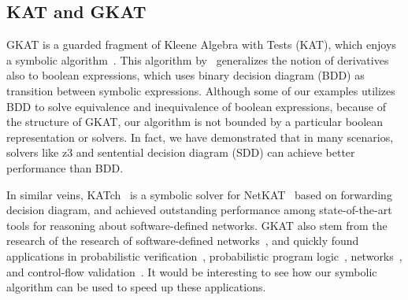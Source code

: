 \documentclass[conference]{IEEEtran}
\begin{document}
\subsection{KAT and GKAT}

GKAT is a guarded fragment of Kleene Algebra with Tests (KAT), which enjoys a symbolic algorithm~\cite{pous_SymbolicAlgorithmsLanguage_2015}.
This algorithm by~\citeauthor{pous_SymbolicAlgorithmsLanguage_2015} generalizes the notion of derivatives also to boolean expressions, which uses binary decision diagram (BDD) as transition between symbolic expressions.
Although some of our examples utilizes BDD to solve equivalence and inequivalence of boolean expressions, because of the structure of GKAT, our algorithm is not bounded by a particular boolean representation or solvers.
In fact, we have demonstrated that in many scenarios, solvers like z3 and sentential decision diagram (SDD) can achieve better performance than BDD.

In similar veins, KATch~\cite{moeller_KATchFastSymbolic_2024} is a symbolic solver for NetKAT~\cite{anderson_NetKATSemanticFoundations_2014} based on forwarding decision diagram, and achieved outstanding performance among state-of-the-art tools for reasoning about software-defined networks.
GKAT also stem from the research of the research of software-defined networks~\cite{smolka_ScalableVerificationProbabilistic_2019,smolka_GuardedKleeneAlgebra_2020}, and quickly found applications in probabilistic verification~\cite{ro.zowski_ProbabilisticGuardedKAT_2023}, probabilistic program logic~\cite{gomes_KleeneAlgebraTests_2024}, networks~\cite{wasserstein_GUARDEDNETKATSOUNDNESS_2023}, and control-flow validation~\cite{zhang_CFGKATEfficientValidation_2025}.
It would be interesting to see how our symbolic algorithm can be used to speed up these applications.

\printbibliography

\clearpage
\appendix
\end{document}
